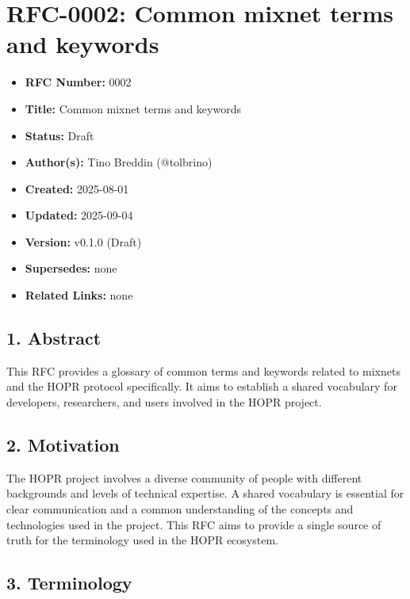 \section{RFC-0002: Common mixnet terms and
keywords}\label{rfc-0002-common-mixnet-terms-and-keywords}

\begin{itemize}
\tightlist
\item
  \textbf{RFC Number:} 0002
\item
  \textbf{Title:} Common mixnet terms and keywords
\item
  \textbf{Status:} Draft
\item
  \textbf{Author(s):} Tino Breddin (@tolbrino)
\item
  \textbf{Created:} 2025-08-01
\item
  \textbf{Updated:} 2025-09-04
\item
  \textbf{Version:} v0.1.0 (Draft)
\item
  \textbf{Supersedes:} none
\item
  \textbf{Related Links:} none
\end{itemize}

\subsection{1. Abstract}\label{abstract}

This RFC provides a glossary of common terms and keywords related to
mixnets and the HOPR protocol specifically. It aims to establish a
shared vocabulary for developers, researchers, and users involved in the
HOPR project.

\subsection{2. Motivation}\label{motivation}

The HOPR project involves a diverse community of people with different
backgrounds and levels of technical expertise. A shared vocabulary is
essential for clear communication and a common understanding of the
concepts and technologies used in the project. This RFC aims to provide
a single source of truth for the terminology used in the HOPR ecosystem.

\subsection{3. Terminology}\label{terminology}


